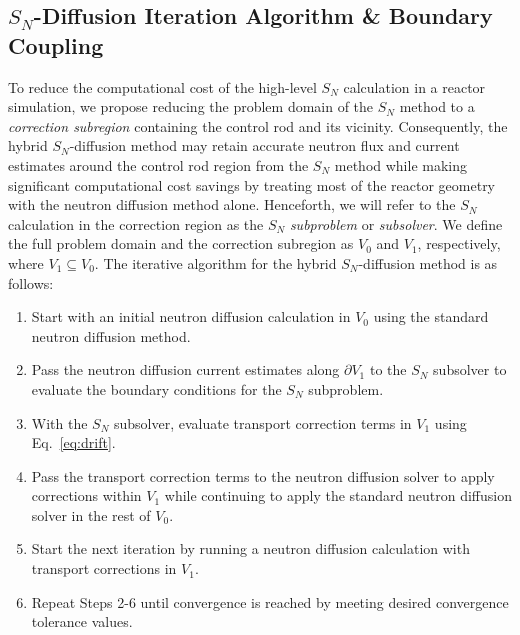 \documentclass[letterpaper]{mc2025}
\begin{document}
\subsection{$S_N$-Diffusion Iteration Algorithm \& Boundary Coupling} \label{sec:hybrid-algorithm}

To reduce the computational cost of the high-level $S_N$ calculation in a reactor
simulation, we propose reducing the problem domain of the $S_N$ method to a
\textit{correction subregion} containing the control rod
and its vicinity. Consequently, the hybrid $S_N$-diffusion method may retain accurate neutron flux
and current estimates around the control rod region from the $S_N$ method while making significant
computational cost savings by treating most of the reactor geometry with the neutron diffusion
method alone. Henceforth, we will refer to the $S_N$ calculation in the correction
region as the $S_N$ \textit{subproblem} or \textit{subsolver}. We define the full problem
domain and the correction subregion as $V_0$ and $V_1$, respectively, where
$V_1\subseteq V_0$. The iterative algorithm for the hybrid $S_N$-diffusion method is as follows:
%
\begin{enumerate}
  \item Start with an initial neutron diffusion calculation in $V_0$ using the standard neutron
    diffusion method.
  \item Pass the neutron diffusion current estimates along
    $\partial V_1$ to the $S_N$ subsolver to evaluate the boundary conditions for the $S_N$
    subproblem.
  \item With the $S_N$ subsolver, evaluate transport correction terms in $V_1$ using Eq.\
    \ref{eq:drift}.
  \item Pass the transport correction terms to the neutron diffusion solver to apply corrections
    within $V_1$ while continuing to apply the standard neutron diffusion solver
    in the rest of $V_0$.
  \item Start the next iteration by running a neutron diffusion calculation with transport
    corrections in $V_1$.
  \item Repeat Steps 2-6 until convergence is reached by meeting desired convergence tolerance
    values.
\end{enumerate}
\end{document}
